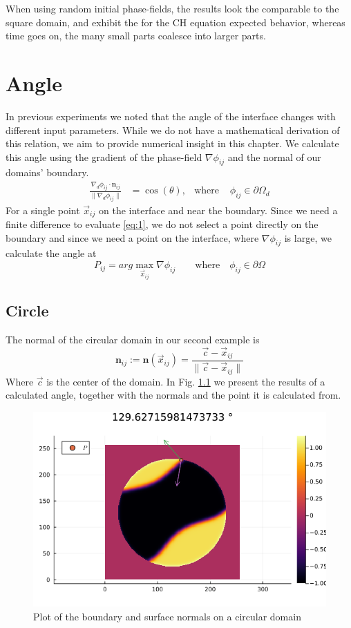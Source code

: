 \documentclass{mimosis}
\begin{document}
When using random initial phase-fields, the results look the comparable to the square domain, and exhibit the for the CH equation expected behavior, whereas time goes on, the many small parts coalesce into larger parts.
\chapter{Angle}
\label{sec:org91a311c}
In previous experiments we noted that the angle of the interface changes with different input parameters. While we do not have a mathematical derivation of this relation, we aim to provide numerical insight in this chapter. We calculate this angle using the gradient of the phase-field \(\nabla \phi_{ij}\) and the normal of our domains' boundary.
\begin{align}
\label{eq:1}
\frac{\nabla_d \phi_{ij} \cdot \mathbf{n}_{ij}}{\|\nabla_{d} \phi_{ij}\|} &= \cos(\theta),& \text{where}\,&\, \phi_{ij} \in \partial\Omega_{d}
\end{align}
For a single point \(\vec{x}_{ij}\) on the interface and near the boundary. Since we need a finite difference to evaluate \eqref{eq:1}, we do not select a point directly on the boundary and since we need a point on the interface, where \(\nabla \phi_{ij}\) is large, we calculate the angle at
\begin{equation}
\label{eq:2}
P_{ij} = arg\max_{\vec{x}_{ij}} \nabla \phi_{ij} \qquad \text{where} \quad \phi_{ij} \in \partial \Omega
\end{equation}
\section{Circle}
\label{sec:orga8cca41}
The normal of the circular domain in our second example is
\begin{equation}
\label{eq:3}
\mathbf{n}_{ij} := \mathbf{n}(\vec{x}_{ij}) = \frac{\vec{c} - \vec{x}_{ij}}{\| \vec{c} - \vec{x}_{ij}\|}
\end{equation}
Where \(\vec{c}\) is the center of the domain.
In Fig. \ref{fig:angle-on-circle} we present the results of a calculated angle, together with the normals and the point it is calculated from.
\begin{figure}[htbp]
\centering
\includegraphics[width=.9\linewidth]{images/angle-circle.png}
\caption{\label{fig:angle-on-circle}Plot of the boundary and surface normals on a circular domain}
\end{figure}
\end{document}
